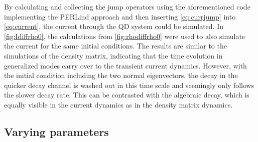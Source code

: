 \documentclass[../main.tex]{subfiles}
\begin{document}
By calculating and collecting the jump operators using the aforementioned code implementing the PERLind approach and then inserting \cref{eq:currjump} into \cref{eq:current}, the current through the QD system could be simulated. In \cref{fig:Idiffrho0}, the calculations from \cref{fig:rhodiffrho0} were used to also simulate the current for the same initial conditions. The results are similar to the simulations of the density matrix, indicating that the time evolution in generalized modes carry over to the transient current dynamics. However, with the initial condition including the two normal eigenvectors, the decay in the quicker decay channel is washed out in this time scale and seemingly only follows the slower decay rate. This can be contrasted with the algebraic decay, which is equally visible in the current dynamics as in the density matrix dynamics.


\subsection{Varying parameters}
\end{document}
